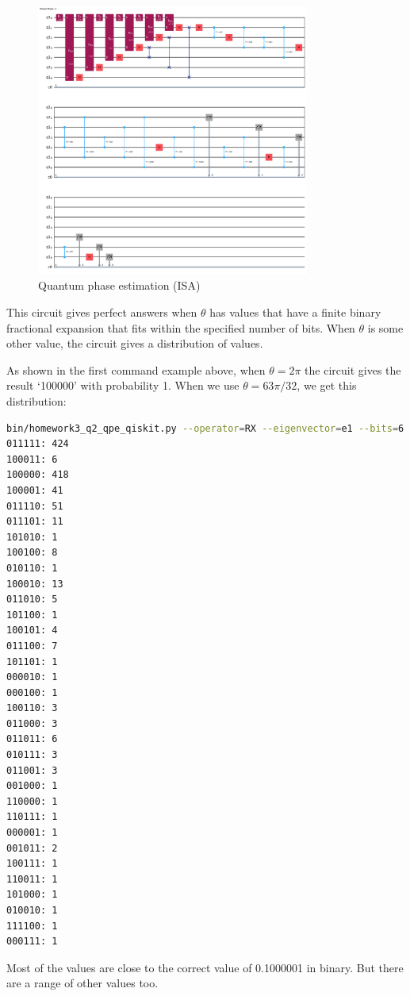 \documentclass[12pt]{extarticle}
\begin{document}
\begin{figure}[H]
\centering
\includegraphics[width=0.80\textwidth]{images/homework3_q2_qpe_rx_e1_21pi8_isa.png}
\caption{Quantum phase estimation (ISA)}
\label{fig:qpe_rx_e1_21pi8_isa}
\end{figure}

This circuit gives perfect answers when $\theta$ has values that have a finite binary fractional expansion that fits within the specified number of bits.
When $\theta$ is some other value, the circuit gives a distribution of values.

As shown in the first command example above, when $\theta=2\pi$ the circuit gives the result `100000' with probability 1.
When we use $\theta=63\pi/32$, we get this distribution:

\begin{lstlisting}[language=bash]
bin/homework3_q2_qpe_qiskit.py --operator=RX --eigenvector=e1 --bits=6 --theta="63*pi/32"
011111: 424
100011: 6
100000: 418
100001: 41
011110: 51
011101: 11
101010: 1
100100: 8
010110: 1
100010: 13
011010: 5
101100: 1
100101: 4
011100: 7
101101: 1
000010: 1
000100: 1
100110: 3
011000: 3
011011: 6
010111: 3
011001: 3
001000: 1
110000: 1
110111: 1
000001: 1
001011: 2
100111: 1
110011: 1
101000: 1
010010: 1
111100: 1
000111: 1
\end{lstlisting}

Most of the values are close to the correct value of 0.1000001 in binary.
But there are a range of other values too.



\printbibliography
{}
\end{document}
